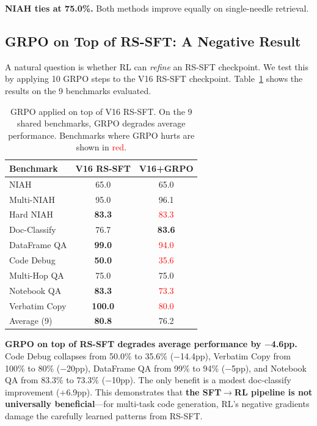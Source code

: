 \documentclass{article}
\begin{document}
\textbf{NIAH ties at 75.0\%.} Both methods improve equally on single-needle retrieval.

\subsection{GRPO on Top of RS-SFT: A Negative Result}
\label{sec:grpo-on-sft}

A natural question is whether RL can \emph{refine} an RS-SFT checkpoint. We test this by applying 10 GRPO steps to the V16 RS-SFT checkpoint. Table~\ref{tab:grpo-on-sft} shows the results on the 9 benchmarks evaluated.

\begin{table}[t]
\caption{GRPO applied on top of V16 RS-SFT. On the 9 shared benchmarks, GRPO degrades average performance. Benchmarks where GRPO hurts are shown in \textcolor{red}{red}.}
\label{tab:grpo-on-sft}
\vskip 0.15in
\begin{center}
\begin{small}
\begin{tabular}{lcc}
\toprule
Benchmark & V16 RS-SFT & V16+GRPO \\
\midrule
NIAH & 65.0 & 65.0 \\
Multi-NIAH & 95.0 & 96.1 \\
Hard NIAH & \textbf{83.3} & \textcolor{red}{83.3} \\
Doc-Classify & 76.7 & \textbf{83.6} \\
DataFrame QA & \textbf{99.0} & \textcolor{red}{94.0} \\
Code Debug & \textbf{50.0} & \textcolor{red}{35.6} \\
Multi-Hop QA & 75.0 & 75.0 \\
Notebook QA & \textbf{83.3} & \textcolor{red}{73.3} \\
Verbatim Copy & \textbf{100.0} & \textcolor{red}{80.0} \\
\midrule
Average (9) & \textbf{80.8} & 76.2 \\
\bottomrule
\end{tabular}
\end{small}
\end{center}
\vskip -0.15in
\end{table}

\textbf{GRPO on top of RS-SFT degrades average performance by $-$4.6pp.} Code Debug collapses from 50.0\% to 35.6\% ($-$14.4pp), Verbatim Copy from 100\% to 80\% ($-$20pp), DataFrame QA from 99\% to 94\% ($-$5pp), and Notebook QA from 83.3\% to 73.3\% ($-$10pp). The only benefit is a modest doc-classify improvement ($+$6.9pp). This demonstrates that \textbf{the SFT$\to$RL pipeline is not universally beneficial}---for multi-task code generation, RL's negative gradients damage the carefully learned patterns from RS-SFT.
\end{document}
